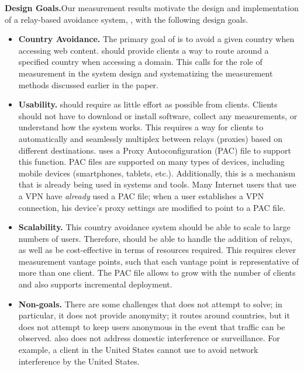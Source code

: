 {\bf Design Goals.}Our measurement results motivate 
 the design and implementation of a relay-based avoidance system,
\system{}, with the following design goals.
\label{goals}
\begin{itemize}
\item {\bf Country Avoidance.}  The primary goal of \system{} is to
avoid a given country when accessing web content.  \system{} should
provide clients a way to route around a specified country when
accessing a domain.  This calls for the role of measurement in the
system design and systematizing the measurement methods discussed
earlier in the paper.

\item {\bf Usability.} \system{} should require as little effort as
possible from clients.  Clients should not have to download
or install software, collect any measurements, or understand how the
system works.  This requires a way for clients to automatically and
seamlessly multiplex between relays (proxies) based on different
destinations.  \system{} uses a Proxy Autoconfiguration (PAC) file to support this
function.  PAC files are supported on many types of devices, including mobile 
devices (smartphones, tablets, etc.).  Additionally, this is a mechanism that 
is already being used in systems and tools.  Many Internet users that 
use a VPN have {\it already} used a PAC file; when a user establishes a VPN connection, his 
device's proxy settings are modified to point to a PAC file.  

\item {\bf Scalability.}  This country avoidance system should be able to scale to 
large numbers of users.  Therefore, \system{} should be able to handle the addition
 of relays, as well as be cost-effective in terms of resources required. This requires 
clever measurement vantage points, such that each vantage point is representative of 
more than one client.  The PAC file allows \system{} to 
grow with the number of clients and also supports incremental deployment.

\item {\bf Non-goals.}  There are some challenges that \system{} does not
attempt to  solve; in particular, it does not provide anonymity; it routes
around  countries,
but it does not attempt to keep users anonymous in the event that traffic can
be observed.   \system{} also does not address domestic interference or surveillance. For
example, a client in the United States cannot use \system{} to avoid network interference 
by the United States. 
\end{itemize}
